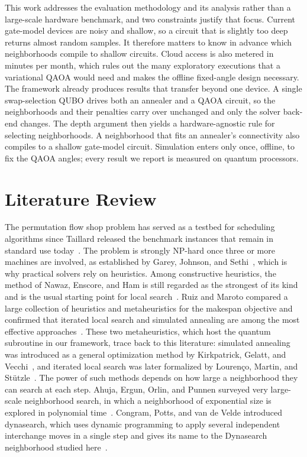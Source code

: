 \documentclass{svproc}
\begin{document}
This work addresses the evaluation methodology and its analysis rather
than a large-scale hardware benchmark, and two constraints justify that
focus. Current gate-model devices are noisy and shallow, so a circuit
that is slightly too deep returns almost random samples. It therefore
matters to know in advance which neighborhoods compile to shallow
circuits. Cloud access is also metered in minutes per month, which rules
out the many exploratory executions that a variational QAOA would need
and makes the offline fixed-angle design necessary. The framework already
produces results that transfer beyond one device. A single swap-selection
QUBO drives both an annealer and a QAOA circuit, so the neighborhoods and
their penalties carry over unchanged and only the solver back-end
changes. The depth argument then yields a hardware-agnostic rule for
selecting neighborhoods. A neighborhood that fits an annealer's
connectivity also compiles to a shallow gate-model circuit. Simulation enters
only once, offline, to fix the QAOA angles; every result we report is
measured on quantum processors.

\section{Literature Review}
\label{sec:related}
The permutation flow shop problem has served as a testbed for scheduling
algorithms since Taillard released the benchmark instances that remain in
standard use today~\cite{taillard1993}. The problem is strongly NP-hard
once three or more machines are involved, as established by Garey,
Johnson, and Sethi~\cite{garey1976}, which is why practical solvers rely
on heuristics. Among constructive heuristics, the method of Nawaz,
Enscore, and Ham is still regarded as the strongest of its kind and is
the usual starting point for local search~\cite{neh1983}. Ruiz and Maroto
compared a large collection of heuristics and metaheuristics for the
makespan objective and confirmed that iterated local search and simulated
annealing are among the most effective approaches~\cite{ruizmaroto2005}.
These two metaheuristics, which host the quantum subroutine in our
framework, trace back to this literature: simulated annealing was
introduced as a general optimization method by Kirkpatrick, Gelatt, and
Vecchi~\cite{kirkpatrick1983}, and iterated local search was later
formalized by Louren\c{c}o, Martin, and St\"{u}tzle~\cite{lourenco2003}.
The power of such methods depends on how large a neighborhood they can
search at each step. Ahuja, Ergun, Orlin, and Punnen surveyed very
large-scale neighborhood search, in which a neighborhood of exponential
size is explored in polynomial time~\cite{ahuja2002}. Congram, Potts, and
van de Velde introduced dynasearch, which uses dynamic programming to
apply several independent interchange moves in a single step and gives
its name to the Dynasearch neighborhood studied here~\cite{congram2002}.
\end{document}
